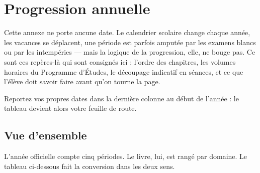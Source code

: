 \chapter{Progression annuelle}

Cette annexe ne porte aucune date. Le calendrier scolaire change chaque année,
les vacances se déplacent, une période est parfois amputée par les examens
blancs ou par les intempéries — mais la logique de la progression, elle, ne
bouge pas. Ce sont ces repères-là qui sont consignés ici : l'ordre des
chapitres, les volumes horaires du Programme d'Études, le découpage indicatif
en séances, et ce que l'élève doit savoir faire avant qu'on tourne la page.

Reportez vos propres dates dans la dernière colonne au début de l'année : le
tableau devient alors votre feuille de route.

\section*{Vue d'ensemble}

L'année officielle compte cinq périodes. Le livre, lui, est rangé par domaine.
Le tableau ci-dessous fait la conversion dans les deux sens.

